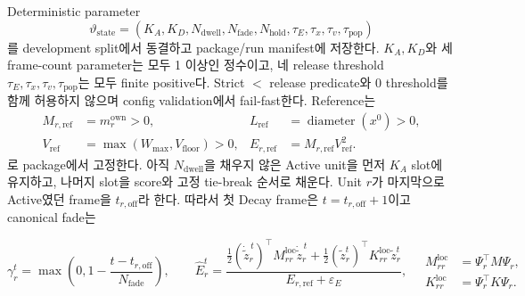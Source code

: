 \documentclass[11pt]{article}
\begin{document}
Deterministic parameter
\[
  \vartheta_{\mathrm{state}}
  =
  \left(K_A,K_D,N_{\mathrm{dwell}},N_{\mathrm{fade}},N_{\mathrm{hold}},
  \tau_E,\tau_x,\tau_v,\tau_{\mathrm{pop}}\right)
\]
를 development split에서 동결하고 package/run manifest에 저장한다.
\(K_A,K_D\)와 세 frame-count parameter는 모두 1 이상인 정수이고,
네 release threshold \(\tau_E,\tau_x,\tau_v,\tau_{\mathrm{pop}}\)는 모두 finite positive다.
Strict \(<\) release predicate와 0 threshold를 함께 허용하지 않으며 config validation에서 fail-fast한다.
Reference는
\[
\begin{aligned}
  M_{r,\mathrm{ref}}&=m_r^{\mathrm{own}}>0,&
  L_{\mathrm{ref}}&=\operatorname{diameter}(x^0)>0,\\
  V_{\mathrm{ref}}&=\max(W_{\max},V_{\mathrm{floor}})>0,&
  E_{r,\mathrm{ref}}&=M_{r,\mathrm{ref}}V_{\mathrm{ref}}^2.
\end{aligned}
\]
로 package에서 고정한다.
아직 \(N_{\mathrm{dwell}}\)을 채우지 않은 Active unit을 먼저 \(K_A\) slot에 유지하고,
나머지 slot을 score와 고정 tie-break 순서로 채운다.
Unit \(r\)가 마지막으로 Active였던 frame을 \(t_{r,\mathrm{off}}\)라 한다.
따라서 첫 Decay frame은 \(t=t_{r,\mathrm{off}}+1\)이고 canonical fade는

\begin{equation}
  \gamma_r^t
  =
  \max\!\left(0,1-\frac{t-t_{r,\mathrm{off}}}{N_{\mathrm{fade}}}\right),
  \qquad
  \widehat E_r^t
  =
  \frac{
    \tfrac12(\dot{\widetilde z}_r^{\,t})^\top
      M_{rr}^{\mathrm{loc}}\dot{\widetilde z}_r^{\,t}
    +\tfrac12(\widetilde z_r^t)^\top K_{rr}^{\mathrm{loc}}\widetilde z_r^t
  }{E_{r,\mathrm{ref}}+\varepsilon_E},
  \quad
  \begin{aligned}
  M_{rr}^{\mathrm{loc}}&=\Psi_r^\top M\Psi_r,\\
  K_{rr}^{\mathrm{loc}}&=\Psi_r^\top K\Psi_r .
  \end{aligned}
  \label{eq:minimal-decay-release}
\end{equation}
\end{document}
